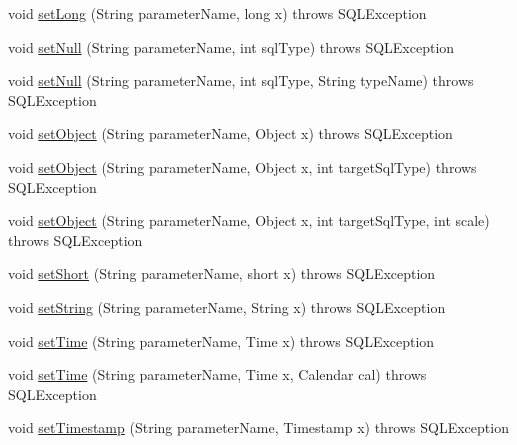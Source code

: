 \begin{DoxyCompactItemize}
\item 
void \mbox{\hyperlink{classcom_1_1mysql_1_1jdbc_1_1_callable_statement_aedc4d1d0cebc116fe920a3625412a7dc}{set\+Long}} (String parameter\+Name, long x)  throws S\+Q\+L\+Exception 
\item 
void \mbox{\hyperlink{classcom_1_1mysql_1_1jdbc_1_1_callable_statement_a93ec882791bb53756dd61ab9a629e027}{set\+Null}} (String parameter\+Name, int sql\+Type)  throws S\+Q\+L\+Exception 
\item 
void \mbox{\hyperlink{classcom_1_1mysql_1_1jdbc_1_1_callable_statement_a7b65000fc5f68bdce16ea0f9a609948b}{set\+Null}} (String parameter\+Name, int sql\+Type, String type\+Name)  throws S\+Q\+L\+Exception 
\item 
void \mbox{\hyperlink{classcom_1_1mysql_1_1jdbc_1_1_callable_statement_a82522267faf9a0ffc45dcba28b0fabd9}{set\+Object}} (String parameter\+Name, Object x)  throws S\+Q\+L\+Exception 
\item 
void \mbox{\hyperlink{classcom_1_1mysql_1_1jdbc_1_1_callable_statement_aad9b3a4c4845fc215c595ea6f9adebfd}{set\+Object}} (String parameter\+Name, Object x, int target\+Sql\+Type)  throws S\+Q\+L\+Exception 
\item 
void \mbox{\hyperlink{classcom_1_1mysql_1_1jdbc_1_1_callable_statement_a36eb0517921dbe1e680ab46705268c42}{set\+Object}} (String parameter\+Name, Object x, int target\+Sql\+Type, int scale)  throws S\+Q\+L\+Exception 
\item 
void \mbox{\hyperlink{classcom_1_1mysql_1_1jdbc_1_1_callable_statement_a715ea2ed1e9bc4a7bb46c9f9365ffa1b}{set\+Short}} (String parameter\+Name, short x)  throws S\+Q\+L\+Exception 
\item 
void \mbox{\hyperlink{classcom_1_1mysql_1_1jdbc_1_1_callable_statement_ad2fcf3142fbe101af83b0ee9b9d45f9c}{set\+String}} (String parameter\+Name, String x)  throws S\+Q\+L\+Exception 
\item 
void \mbox{\hyperlink{classcom_1_1mysql_1_1jdbc_1_1_callable_statement_a3a17ab41bb2d2edd46042dc05aadda4d}{set\+Time}} (String parameter\+Name, Time x)  throws S\+Q\+L\+Exception 
\item 
void \mbox{\hyperlink{classcom_1_1mysql_1_1jdbc_1_1_callable_statement_a9295718be5a4fc486123ab0254a4b18e}{set\+Time}} (String parameter\+Name, Time x, Calendar cal)  throws S\+Q\+L\+Exception 
\item 
void \mbox{\hyperlink{classcom_1_1mysql_1_1jdbc_1_1_callable_statement_a09f76d55b898a951fb5a754781c859ee}{set\+Timestamp}} (String parameter\+Name, Timestamp x)  throws S\+Q\+L\+Exception 

\end{DoxyCompactItemize}

